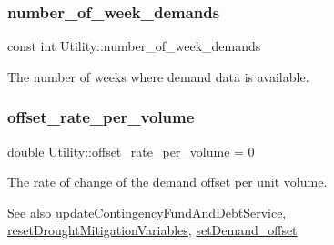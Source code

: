 \mbox{\label{classUtility_a0548db3746582251082aa430db49dad0}} 
\subsubsection{\texorpdfstring{number\+\_\+of\+\_\+week\+\_\+demands}{number\_of\_week\_demands}}
{\footnotesize\ttfamily const int Utility\+::number\+\_\+of\+\_\+week\+\_\+demands}



The number of weeks where demand data is available. 

\mbox{\label{classUtility_a82c8cf50e20ab43c6b99d602b3d5d3c8}} 
\subsubsection{\texorpdfstring{offset\+\_\+rate\+\_\+per\+\_\+volume}{offset\_rate\_per\_volume}}
{\footnotesize\ttfamily double Utility\+::offset\+\_\+rate\+\_\+per\+\_\+volume = 0\hspace{0.3cm}{\ttfamily [private]}}



The rate of change of the demand offset per unit volume. 

\begin{DoxySeeAlso}{See also}
\mbox{\hyperlink{classUtility_ab663efd526505a3d843cae7075cc3b91}{update\+Contingency\+Fund\+And\+Debt\+Service}}, \mbox{\hyperlink{classUtility_af9ec9c2cb69166db021f03ce9ddf4d8e}{reset\+Drought\+Mitigation\+Variables}}, \mbox{\hyperlink{classUtility_a6e7f1df1fcde0b14475c7045bdcaf218}{set\+Demand\+\_\+offset}} 
\end{DoxySeeAlso}
\mbox{\label{classUtility_a7b1a097ec188be8e7175d058b5e6596c}} 
